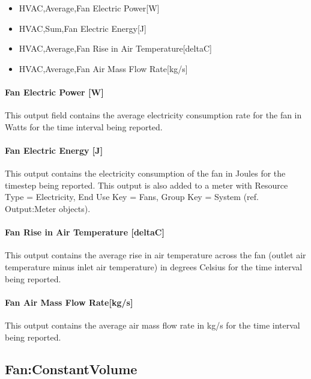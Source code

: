 \begin{itemize}
\item
HVAC,Average,Fan Electric Power{[}W{]}
\item
HVAC,Sum,Fan Electric Energy{[}J{]}
\item
HVAC,Average,Fan Rise in Air Temperature{[}deltaC{]}
\item
HVAC,Average,Fan Air Mass Flow Rate{[}kg/s{]}
\end{itemize}

\paragraph{Fan Electric Power {[}W{]}}\label{fan-electric-power-fansysmodel}

This output field contains the average electricity consumption rate for the fan in Watts for the time interval being reported.

\paragraph{Fan Electric Energy {[}J{]}}\label{fan-electric-energy-fansysmodel}

This output contains the electricity consumption of the fan in Joules for the timestep being reported. This output is also added to a meter with Resource Type = Electricity, End Use Key = Fans, Group Key = System (ref. Output:Meter objects).

\paragraph{Fan Rise in Air Temperature {[}deltaC{]}}\label{fan-rise-in-air-temperature-deltac-fansysmodel}

This output contains the average rise in air temperature across the fan (outlet air temperature minus inlet air temperature) in degrees Celsius for the time interval being reported.

\paragraph{Fan Air Mass Flow Rate{[}kg/s{]}}\label{fan-air-mass-flow-fansysmodel}

This output contains the average air mass flow rate in kg/s for the time interval being reported.

\subsection{Fan:ConstantVolume}\label{fanconstantvolume}


